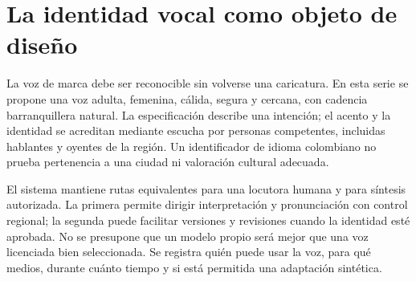 \def\paperRoman{IV}


\begin{abstract}
Se propone un sistema de identidad sonora para películas explicativas de GoToGym que separa voz de marca, pronunciación, acento regional, inteligibilidad, expresividad y calidad de mezcla. La locución femenina colombiana con identidad barranquillera se trata como un problema de casting y validación perceptual, no como un parámetro de velocidad o tono. Se formalizan un modelo condicionado de generación de voz, una optimización restringida de duración y una alineación temporal basada en señales reales. La mezcla se define por stems independientes, control de dinámica y medición de sonoridad conforme al algoritmo de referencia pertinente. Se distingue el objetivo editorial de distribución digital de la normalización de radiodifusión. Se especifican conjuntos de prueba, evaluadores, métricas, contratos de proveedor y criterios de rechazo. La contribución QAF se plantea en la coordinación contextual entre mensaje, momento narrativo y decisiones de sonido, con comparación frente a reglas y modelos clásicos igualmente informados.
\end{abstract}

\section{La identidad vocal como objeto de diseño}
La voz de marca debe ser reconocible sin volverse una caricatura. En esta serie se propone una voz adulta, femenina, cálida, segura y cercana, con cadencia barranquillera natural. La especificación describe una intención; el acento y la identidad se acreditan mediante escucha por personas competentes, incluidas hablantes y oyentes de la región. Un identificador de idioma colombiano no prueba pertenencia a una ciudad ni valoración cultural adecuada.

El sistema mantiene rutas equivalentes para una locutora humana y para síntesis autorizada. La primera permite dirigir interpretación y pronunciación con control regional; la segunda puede facilitar versiones y revisiones cuando la identidad esté aprobada. No se presupone que un modelo propio será mejor que una voz licenciada bien seleccionada. Se registra quién puede usar la voz, para qué medios, durante cuánto tiempo y si está permitida una adaptación sintética.

